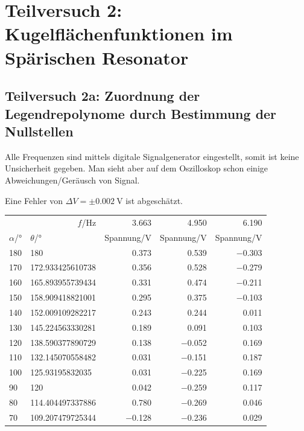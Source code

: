 \section{Teilversuch 2: Kugelflächenfunktionen im Spärischen Resonator}
	\subsection{Teilversuch 2a: Zuordnung der Legendrepolynome durch Bestimmung der Nullstellen}
		Alle Frequenzen sind mittels digitale Signalgenerator eingestellt, somit ist keine Unsicherheit gegeben. Man sieht aber auf dem Oszilloskop schon einige Abweichungen/Geräusch von Signal.

		Eine Fehler von $\Delta V = \pm \SI{0.002}{\volt}$ ist abgeschätzt.
		\begin{center}
			\begin{tabular}{llrrr}
				\toprule
				\multicolumn{2}{r}{$f$/\si{\hertz}} & \num{3,663} & \num{4,950} & \num{6,190} \\
				$\alpha$/\si{\degree} & $\theta$/\si{\degree} & Spannung/\si{\volt} & Spannung/\si{\volt} & Spannung/\si{\volt}  \\
				\midrule
				\num{180} & \num{180} & \num{0,373} & \num{0,539} & \num{-0,303} \\
				\num{170} & \num{172,933425610738} & \num{0,356} & \num{0,528} & \num{-0,279} \\
				\num{160} & \num{165,893955739434} & \num{0,331} & \num{0,474} & \num{-0,211} \\
				\num{150} & \num{158,909418821001} & \num{0,295} & \num{0,375} & \num{-0,103} \\
				\num{140} & \num{152,009109282217} & \num{0,243} & \num{0,244} & \num{0,011} \\
				\num{130} & \num{145,224563330281} & \num{0,189} & \num{0,091} & \num{0,103} \\
				\num{120} & \num{138,590377890729} & \num{0,138} & \num{-0,052} & \num{0,169} \\
				\num{110} & \num{132,145070558482} & \num{0,031} & \num{-0,151} & \num{0,187} \\
				\num{100} & \num{125,93195832035} & \num{0,031} & \num{-0,225} & \num{0,169} \\
				\num{90} & \num{120} & \num{0,042} & \num{-0,259} & \num{0,117} \\
				\num{80} & \num{114,404497337886} & \num{0,780} & \num{-0,269} & \num{0,046} \\
				\num{70} & \num{109,207479725344} & \num{-0,128} & \num{-0,236} & \num{0,029} \\

\end{tabular}
\end{center}

